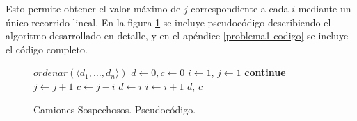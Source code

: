 Esto permite obtener el valor máximo de $j$ correspondiente a cada $i$ mediante un único recorrido lineal. En la figura \ref{problema1-pseudo} se incluye pseudocódigo describiendo el algoritmo desarrollado en detalle, y en el apéndice \ref{problema1-codigo} se incluye el código completo.

\begin{center}
\begin{figure}
    \begin{pseudo}
            \State $ordenar(\langle d_1, \ldots, d_n \rangle)$ 
            \State $d \leftarrow 0, c \leftarrow 0$ 
            \State $i \leftarrow 1$, $j \leftarrow 1$ 
             
                    \textbf{continue} 
                \EndIf
                 
                    \State $j \leftarrow j + 1$ 
                \EndWhile
                 
                    \State $c \leftarrow j - i$ 
                    \State $d \leftarrow i$ 
                \EndIf
                \State $i \leftarrow i + 1$ 
            \EndWhile
            \Return $d$, $c$
        \EndProcedure
    \end{pseudo}
    \caption{Camiones Sospechosos. Pseudocódigo.}
    \label{problema1-pseudo}
\end{figure}
\end{center}
